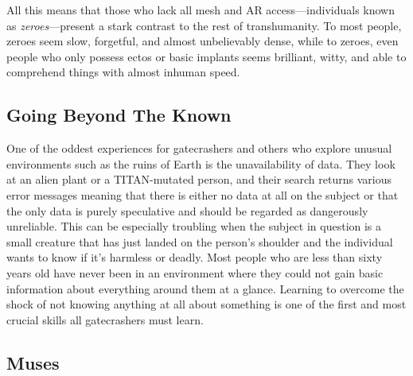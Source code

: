 All this means that those who lack all mesh and AR 
access—individuals known as \textit{zeroes}—present a stark 
contrast to the rest of transhumanity. To most people, 
zeroes seem slow, forgetful, and almost unbelievably 
dense, while to zeroes, even people who only possess 
ectos or basic implants seems brilliant, witty, and able 
to comprehend things with almost inhuman speed.

\subsection{Going Beyond The Known}

One of the oddest experiences for gatecrashers and 
others who explore unusual environments such as the 
ruins of Earth is the unavailability of data. They look 
at an alien plant or a TITAN-mutated person, and 
their search returns various error messages meaning 
that there is either no data at all on the subject or 
that the only data is purely speculative and should 
be regarded as dangerously unreliable. This can be 
especially troubling when the subject in question is 
a small creature that has just landed on the person's 
shoulder and the individual wants to know if it's 
harmless or deadly. Most people who are less than 
sixty years old have never been in an environment 
where they could not gain basic information about 
everything around them at a glance. Learning to overcome
the shock of not knowing anything at all about
something is one of the first and most crucial skills all 
gatecrashers must learn.

\subsection{Muses}

